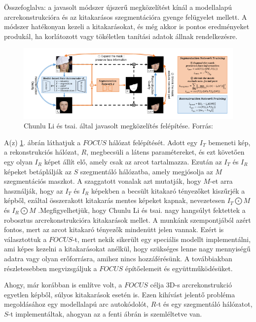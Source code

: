 \documentclass[12pt,a4]{article}
\begin{document}
            Összefoglalva: a javasolt módszer újszerű megközelítést kínál a modellalapú arcrekonstrukcióra és az kitakarásos szegmentációra gyenge felügyelet mellett. A módszer hatékonyan kezeli a kitakarásokat, és még akkor is pontos eredményeket produkál, ha korlátozott vagy tökéletlen tanítási adatok állnak rendelkezésre.

            \begin{figure}[h]	
     		 \centering
     		 \includegraphics[width=1\linewidth]{focus}
     		 \caption{Chunlu Li és tsai. által javasolt megközelítés felépítése.
     			    Forrás: \cite{focus}}
                    \label{fig:focus}
     	      \end{figure}

            A(z) \ref{fig:focus}. ábrán láthatjuk a $FOCUS$ hálózat felépítését.
            Adott egy $I_{T}$ bemeneti kép, a rekonstrukciós hálózat, $R$, megbecsüli a látens
     	      paramétereket, és ezt követően egy olyan $I_{R}$ képet állít elő, amely csak az
     	      arcot tartalmazza. Ezután az $I_{T}$ és $I_{R}$ képeket betáplálják az 
            $S$ szegmentáló hálózatba, amely megjósolja az $M$ szegmentációs maszkot. A szaggatott vonalak azt mutatják, hogy $M$-et arra használják, hogy az $I_{T}$ és $I_{R}$ képekben a becsült kitakaró tényezőket kiszűrjék a képből, ezáltal összerakott kitakarás mentes képeket kapnak, nevezetesen $I_{T}\bigodot M$ és $I_{R}\bigodot M$ .Megfigyelhetjük, hogy Chunlu Li és tsai. nagy hangsúlyt fektettek a robosztus arcrekonstrukcióra kitakarások mellet. A munkánk szempontjából
     	      azért fontos, mert az arcot kitakaró tényezők mindenütt jelen vannak. 
            Ezért is választottuk a $FOCUS$-t, mert nekik sikerült egy speciális modellt implementálni, ami képes kezelni a kitakarásokat anélkül, hogy szükséges lenne nagy mennyiségű adatra vagy olyan erőforrásra, amihez nincs hozzáférésünk.
     	      A továbbiakban részletesebben megvizsgáljuk a $FOCUS$ építőelemeit és
     	      együttműködésüket.

            Ahogy, már korábban is említve volt, a $FOCUS$ célja 3D-s
     	      arcrekonstrukció egyetlen képből, súlyos kitakarások esetén is. Ezen kihívást
     	      jelentő probléma megoldásához egy modellalapú arc autokódolót, $R$-t és
     	      egy szegmentáló hálózatot, $S$-t implementáltak, ahogyan az a fenti ábrán is
     	      szemléltetve van.
    
\end{document}
